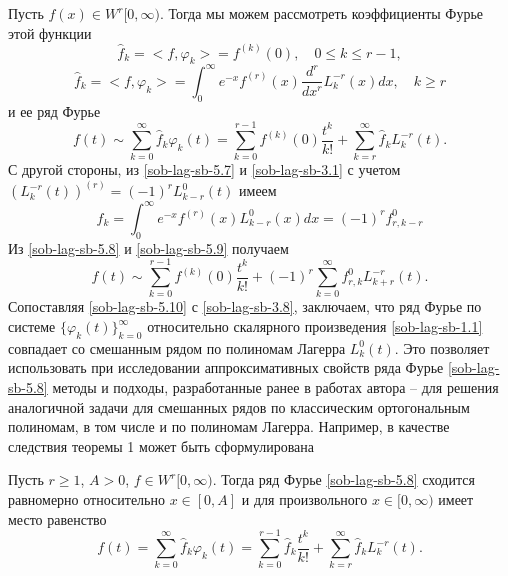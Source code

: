 Пусть $f(x)\in W^r[0,\infty)$. Тогда  мы можем рассмотреть коэффициенты Фурье этой функции
\begin{equation}\label{sob-lag-sb-5.6}
\hat f_k= <f,\varphi_k>=f^{(k)}(0), \quad 0\le k\le r-1,
  \end{equation}
\begin{equation}\label{sob-lag-sb-5.7}
 \hat f_k= <f,\varphi_k>= \int_0^\infty e^{-x}f^{(r)}(x) \frac{d^r}{dx^r}L_{k}^{-r}(x)dx, \quad k\ge r
  \end{equation}
и ее ряд Фурье
\begin{equation}\label{sob-lag-sb-5.8}
f(t)\sim \sum_{k=0}^\infty \hat f_k\varphi_k(t)=  \sum_{k=0}^{r-1}f^{(k)}(0)\frac{t^k}{k!}+ \sum_{k=r}^\infty \hat f_k L_{k}^{-r}(t).
   \end{equation}
С другой стороны, из \eqref{sob-lag-sb-5.7} и \eqref{sob-lag-sb-3.1} с учетом  $\left(L_k^{-r}(t)\right)^{(r)}=(-1)^rL_{k-r}^{0}(t)$ имеем
\begin{equation}\label{sob-lag-sb-5.9}
 \hat f_k=  \int_0^\infty e^{-x}f^{(r)}(x) L_{k-r}^{0}(x)dx=(-1)^rf_{r,k-r}^0
  \end{equation}
 Из \eqref{sob-lag-sb-5.8} и \eqref{sob-lag-sb-5.9} получаем
\begin{equation}\label{sob-lag-sb-5.10}
f(t)\sim  \sum_{k=0}^{r-1}f^{(k)}(0)\frac{t^k}{k!}+(-1)^r\sum_{k=0}^\infty f_{r,k}^0L_{k+r}^{-r}(t) .
   \end{equation}
Сопоставляя \eqref{sob-lag-sb-5.10} с \eqref{sob-lag-sb-3.8}, заключаем, что ряд Фурье по системе $\{\varphi_k(t)\}_{k=0}^\infty$ относительно скалярного
произведения \eqref{sob-lag-sb-1.1} совпадает  со смешанным рядом по полиномам Лагерра $L_k^0(t)$.
 Это позволяет использовать при исследовании  аппроксимативных свойств ряда Фурье \eqref{sob-lag-sb-5.8} методы и подходы, разработанные ранее в работах автора \cite{sob-lag-sb-Shar11} -- \cite{sob-lag-sb-Shar16} для решения  аналогичной задачи для смешанных рядов по классическим ортогональным полиномам, в том числе и по полиномам Лагерра. Например, в качестве следствия теоремы 1 может быть  сформулирована
\begin{theorem}   Пусть  $r\ge1$,   $A>0$, $f\in W^r[0,\infty)$. Тогда  ряд Фурье \eqref{sob-lag-sb-5.8}  сходится равномерно относительно $x\in[0,A]$ и для   произвольного $x\in[0,\infty)$ имеет место равенство
\begin{equation}\label{sob-lag-sb-5.11}
f(t)= \sum_{k=0}^\infty \hat f_k\varphi_k(t)=  \sum_{k=0}^{r-1}\hat f_k\frac{t^k}{k!}+ \sum_{k=r}^\infty \hat f_k L_{k}^{-r}(t).
   \end{equation}



\end{theorem}









